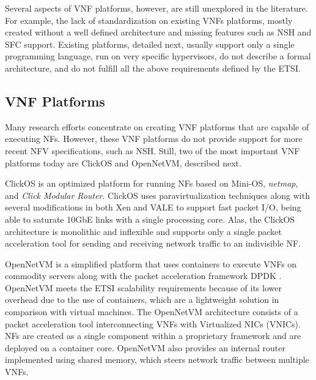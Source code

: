 

Several aspects of VNF platforms, however, are still unexplored in the literature. For example, the lack of standardization on existing VNFs platforms, mostly created without a well defined architecture and missing features such as NSH and SFC support. Existing platforms, detailed next, usually support only a single programming language, run on very specific hypervisors, do not describe a formal architecture, and do not fulfill all the above requirements defined by the ETSI.


\subsection{VNF Platforms} \label{PEVNFS}

Many research efforts concentrate on creating VNF platforms that are capable of executing NFs. However, these VNF platforms do not provide support for more recent NFV specifications, such as NSH. Still, two of the most important VNF platforms today are ClickOS and OpenNetVM, described next.

ClickOS \cite{Martins-2014} is an optimized platform for running NFs based on Mini-OS, \textit{netmap}, and \textit{Click Modular Router}. ClickOS uses paravirtualization techniques along with several modifications in both Xen and VALE to support fast packet I/O, being able to saturate 10GbE links with a single processing core. Alas, the ClickOS architecture is monolithic and inflexible and supports only a single packet acceleration tool for sending and receiving network traffic to an indivisible NF.

OpenNetVM \cite{Zhang-2016} is a simplified platform that uses containers to execute VNFs on commodity servers along with the packet acceleration framework DPDK \cite{Intel-2014}. OpenNetVM meets the ETSI scalability requirements because of its lower overhead due to the use of containers, which are a lightweight solution in comparison with virtual machines. The OpenNetVM architecture consists of a packet acceleration tool interconnecting VNFs with Virtualized NICs (VNICs). NFs are created as a single component within a proprietary framework and are deployed on a container core. OpenNetVM also provides an internal router implemented using shared memory, which steers network traffic between multiple VNFs.

